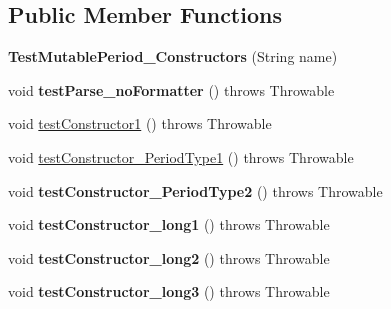 \subsection*{Public Member Functions}
\begin{DoxyCompactItemize}
\item 
\hypertarget{classorg_1_1joda_1_1time_1_1_test_mutable_period___constructors_a1e72c1ad40673efd1c21482873307e69}{{\bfseries Test\-Mutable\-Period\-\_\-\-Constructors} (String name)}\label{classorg_1_1joda_1_1time_1_1_test_mutable_period___constructors_a1e72c1ad40673efd1c21482873307e69}

\item 
\hypertarget{classorg_1_1joda_1_1time_1_1_test_mutable_period___constructors_a196b60b24bd382981fc9c3ea5e23f91a}{void {\bfseries test\-Parse\-\_\-no\-Formatter} ()  throws Throwable }\label{classorg_1_1joda_1_1time_1_1_test_mutable_period___constructors_a196b60b24bd382981fc9c3ea5e23f91a}

\item 
void \hyperlink{classorg_1_1joda_1_1time_1_1_test_mutable_period___constructors_aabb8dbc4c0a5bd232776ef19bedcfbac}{test\-Constructor1} ()  throws Throwable 
\item 
void \hyperlink{classorg_1_1joda_1_1time_1_1_test_mutable_period___constructors_a499ff891c00a03a7f87bafaef5cca34d}{test\-Constructor\-\_\-\-Period\-Type1} ()  throws Throwable 
\item 
\hypertarget{classorg_1_1joda_1_1time_1_1_test_mutable_period___constructors_a6d9a4e994da3791f69d229c064e53ffd}{void {\bfseries test\-Constructor\-\_\-\-Period\-Type2} ()  throws Throwable }\label{classorg_1_1joda_1_1time_1_1_test_mutable_period___constructors_a6d9a4e994da3791f69d229c064e53ffd}

\item 
\hypertarget{classorg_1_1joda_1_1time_1_1_test_mutable_period___constructors_a5dee9f38f036daa4f85a0e5ec2cc0d9f}{void {\bfseries test\-Constructor\-\_\-long1} ()  throws Throwable }\label{classorg_1_1joda_1_1time_1_1_test_mutable_period___constructors_a5dee9f38f036daa4f85a0e5ec2cc0d9f}

\item 
\hypertarget{classorg_1_1joda_1_1time_1_1_test_mutable_period___constructors_aa3c65fc86f47a74eba2ba2009a08d3bf}{void {\bfseries test\-Constructor\-\_\-long2} ()  throws Throwable }\label{classorg_1_1joda_1_1time_1_1_test_mutable_period___constructors_aa3c65fc86f47a74eba2ba2009a08d3bf}

\item 
\hypertarget{classorg_1_1joda_1_1time_1_1_test_mutable_period___constructors_a6988c19574d8f7bf22fee93e0631788d}{void {\bfseries test\-Constructor\-\_\-long3} ()  throws Throwable }\label{classorg_1_1joda_1_1time_1_1_test_mutable_period___constructors_a6988c19574d8f7bf22fee93e0631788d}


\end{DoxyCompactItemize}
